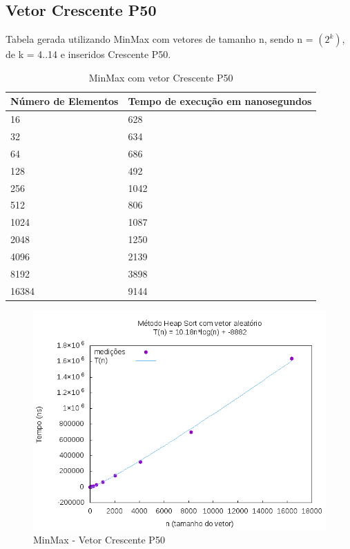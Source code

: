 \documentclass[12pt,a4paper,twoside]{report}
\begin{document}
\subsection{Vetor Crescente P50}
Tabela gerada utilizando MinMax com vetores de tamanho n, sendo n = $(2^k)$, de k = 4..14 e inseridos Crescente P50.
\begin{table}[H]
\centering
\caption{MinMax com vetor Crescente P50}
\label{my-label}
\begin{tabular}{|l|l|}
\hline
\multicolumn{1}{|c|}{\textbf{Número de Elementos}} & \multicolumn{1}{c|}{\textbf{Tempo de execução em nanosegundos}} \\ \hline
16 & 628 \\ \hline
32 & 634 \\ \hline
64 & 686 \\ \hline
128 & 492 \\ \hline
256 & 1042 \\ \hline
512 & 806 \\ \hline
1024 & 1087 \\ \hline
2048 & 1250 \\ \hline
4096 & 2139 \\ \hline
8192 & 3898 \\ \hline
16384 & 9144 \\ \hline
\end{tabular}
\end{table}

\begin{figure}[H]
    \centering
    \includegraphics[width=0.7\linewidth]{graficos/HeapSort/vIntAleatorio/vIntAleatorio.png}
  \caption{MinMax - Vetor Crescente P50}
\end{figure}
\end{document}
